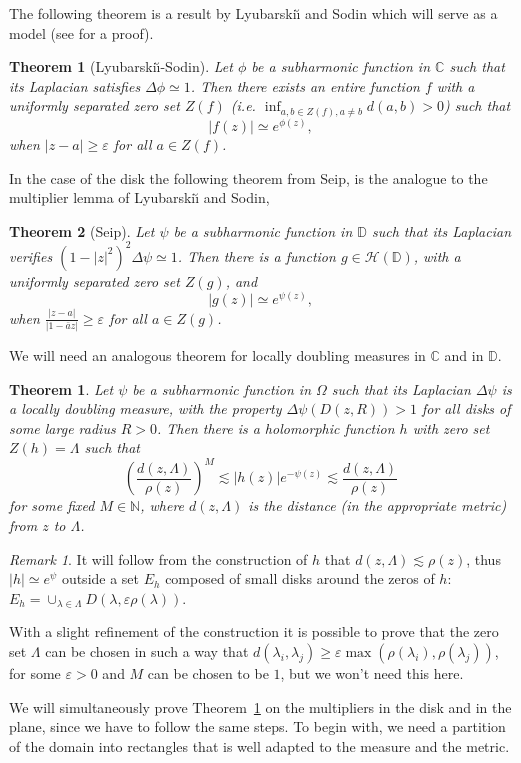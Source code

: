 \documentclass[12pt,twoside,final,psamsfonts]{amsart}
\theoremstyle{plain}
\newtheorem*{teor*}{Theorem}
\newtheorem{teor}{Theorem}
\theoremstyle{remark}
\newtheorem*{remark}{Remark}
\theoremstyle{definition}
\newcommand{\C}{{\mathbb C}}
\newcommand{\N}{{\mathbb N}}
\newcommand{\D}{{\mathbb D}}
\renewcommand{\H}{{\mathcal H}}
\begin{document}
The following theorem is a
result by Lyubarski{\u\i} and Sodin which will serve as a model
(see \cite{LyuSei94} for a proof).

\begin{teor*}[Lyubarski{\u\i}-Sodin]
Let $\phi$ be a subharmonic function in $\C$ such that its Laplacian 
satisfies $\Delta
\phi\simeq 1$. Then there exists an entire function $f$ with a uniformly 
separated 
zero set $Z(f)$ (i.e. $\inf_{a,b\in Z(f),a\ne b}d(a,b)>0$) such that 
\[
|f(z)|\simeq e^{\phi(z)},
\]
when $|z-a|\ge \varepsilon$ for all $a\in Z(f)$.
\end{teor*}


In the case of the disk the following theorem from Seip, \cite{Seip95b} is the
analogue to the multiplier lemma of Lyubarski{\u\i} and Sodin,

\begin{teor*}[Seip]
Let $\psi$ be a subharmonic function in $\D$ such that its Laplacian verifies
$(1-|z|^2)^2\Delta \psi\simeq 1$. Then there is a function $g\in\H(\D)$, with 
a  uniformly separated zero set $Z(g)$, and 
\[
|g(z)|\simeq e^{\psi(z)},
\]
when $\frac {|z-a|}{|1-\bar a z|}\ge \varepsilon$ for all $a\in Z(g)$.
\end{teor*}

We will need an analogous theorem for locally
doubling measures in $\C$ and in $\D$. 

\begin{teor}\label{multiplicador} 
Let $\psi$ be a subharmonic function in $\Omega$ such that its Laplacian
$\Delta \psi$ is a locally
doubling measure,  with the property $\Delta\psi (D(z,R))>1$
for all disks of some large radius $R>0$.  Then there is a holomorphic function
$h$ with zero set $Z(h)=\Lambda$ such that  
\[
\left(\frac{d(z,\Lambda)}{\rho(z)}\right)^M\lesssim
|h(z)|e^{-\psi(z)}\lesssim \frac{d(z,\Lambda)}{\rho(z)}
\]
for some fixed $M\in\N$, where $d(z,\Lambda)$ is the distance 
(in the appropriate metric) from $z$ to $\Lambda$.
\end{teor}
\begin{remark}
It will follow 
from the construction of $h$ that $d(z,\Lambda)\lesssim\rho(z)$,
thus  $|h|\simeq e^{\psi}$ 
outside a set $E_h$ composed  
of small disks around the zeros of $h$:
$E_h=\cup_{\lambda\in\Lambda}D(\lambda,\varepsilon\rho(\lambda))$.

With a slight refinement of the construction it is possible to prove that the
zero set $\Lambda$ can be chosen in such a way that $d(\lambda_i,\lambda_j)\ge
\varepsilon \max(\rho(\lambda_i),\rho(\lambda_j))$, for some $\varepsilon>0$
and $M$ can be chosen to be $1$, but we won't need this here.
\end{remark}
We will simultaneously prove Theorem~\ref{multiplicador} on the multipliers 
in the disk and in the plane, since we have to follow the same 
steps. To begin with,
we need a partition of the domain into rectangles that is 
well adapted to the measure
and the metric.  
\end{document}
